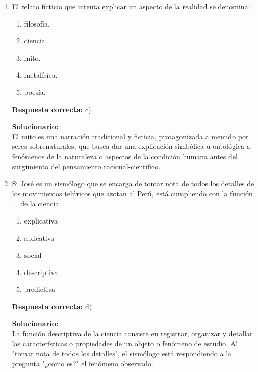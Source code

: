 \begin{enumerate}
	\vspace{6mm}
	
	\item El relato ficticio que intenta explicar un aspecto de la realidad se denomina:
	
	\begin{enumerate}[label=\alph*)]
		\item filosofía.
		\item ciencia.
		\item mito.
		\item metafísica.
		\item poesía.
	\end{enumerate}
	
	\textbf{Respuesta correcta:} c)
	
	\vspace{2mm}
	\textbf{Solucionario:}\\
	El mito es una narración tradicional y ficticia, protagonizada a menudo por seres sobrenaturales, que busca dar una explicación simbólica u ontológica a fenómenos de la naturaleza o aspectos de la condición humana antes del surgimiento del pensamiento racional-científico.
	
	\vspace{6mm}
	
	\item Si José es un sismólogo que se encarga de tomar nota de todos los detalles de los movimientos telúricos que azotan al Perú, está cumpliendo con la función ... de la ciencia.
	
	\begin{enumerate}[label=\alph*)]
		\item explicativa
		\item aplicativa
		\item social
		\item descriptiva
		\item predictiva
	\end{enumerate}
	
	\textbf{Respuesta correcta:} d)
	
	\vspace{2mm}
	\textbf{Solucionario:}\\
	La función descriptiva de la ciencia consiste en registrar, organizar y detallar las características o propiedades de un objeto o fenómeno de estudio. Al "tomar nota de todos los detalles", el sismólogo está respondiendo a la pregunta "¿cómo es?" el fenómeno observado.
	
	\vspace{6mm}
	
\end{enumerate}



